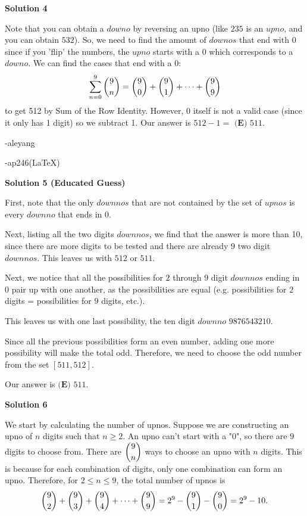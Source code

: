 \begin{enumerate}
\textbf{Solution 4}

Note that you can obtain a $downo$ by reversing an upno (like $235$ is an $upno$, and you can obtain $532$). So, we need to find the amount of $downos$ that end with 0 since if you 'flip' the numbers, the $upno$ starts with a 0 which corresponds to a $downo$. We can find the cases that end with a 0: 
 \[\sum_{n=0}^9 \dbinom{9}{n} = \dbinom{9}{0} + \dbinom{9}{1} + \cdots + \dbinom{9}{9}\] to get 512 by Sum of the Row Identity. However, 0 itself is not a valid case (since it only has 1 digit) so we subtract 1. Our answer is $512 - 1 =$ $\boxed{\textbf{(E) }511}$.

 -aleyang

 -ap246(LaTeX)

 



\textbf{Solution 5 (Educated Guess)}

First, note that the only $downnos$ that are not contained by the set of $upnos$ is every $downno$ that ends in $0$.

 Next, listing all the two digits $downnos$, we find that the answer is more than 10, since there are more digits to be tested and there are already 9 two digit $downnos$. This leaves us with $512$ or $511$. 

 Next, we notice that all the possibilities for $2$ through $9$ digit $downnos$ ending in $0$ pair up with one another, as the possibilities are equal (e.g. possibilities for $2$ digits = possibilities for $9$ digits, etc.). 

 This leaves us with one last possibility, the ten digit $downno$ $9876543210$. 

 Since all the previous possibilities form an even number, adding one more possibility will make the total odd. Therefore, we need to choose the odd number from the set $[511, 512]$. 

 Our answer is $\boxed{\textbf{(E) }511}$.

 



\textbf{Solution 6}

We start by calculating the number of upnos. Suppose we are constructing an upno of $n$ digits such that $n \ge 2$. An upno can't start with a "$0$", so there are $9$ digits to choose from. There are $\dbinom{9}{n}$ ways to choose an upno with $n$ digits. This is because for each combination of digits, only one combination can form an upno. Therefore, for $2 \le n \le 9$, the total number of upnos is 
 \[\binom{9}{2} + \binom{9}{3} + \binom{9}{4} + \cdots + \dbinom{9}{9} = 2^9 - \binom{9}{1} - \binom{9}{0} = 2^9 - 10.\]


\end{enumerate}
